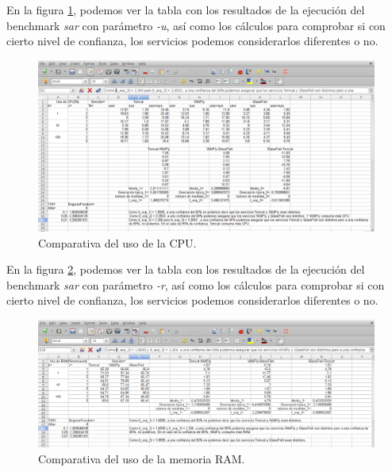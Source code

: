 \documentclass[a4paper, 10pt]{article}
\begin{document}
	En la figura \ref{fig:Comp_CPU}, podemos ver la tabla con los resultados de la ejecución del benchmark
	\textit{sar} con parámetro \textit{-u}, así como los cálculos para comprobar si con cierto nivel de
	confianza, los servicios podemos considerarlos diferentes o no.
		
	\begin{figure}[h!]
		\includegraphics[width=15cm]{Comparativa_CPU.png}
		\caption{Comparativa del uso de la CPU.}
		\label{fig:Comp_CPU}
	\end{figure}
	
	En la figura \ref{fig:Comp_RAM}, podemos ver la tabla con los resultados de la ejecución del benchmark
	\textit{sar} con parámetro \textit{-r}, así como los cálculos para comprobar si con cierto nivel de
	confianza, los servicios podemos considerarlos diferentes o no.

	\begin{figure}[h!]
		\includegraphics[width=15cm]{Comparativa_RAM.png}
		\caption{Comparativa del uso de la memoria RAM.}
		\label{fig:Comp_RAM}
	\end{figure}
	
\end{document}
